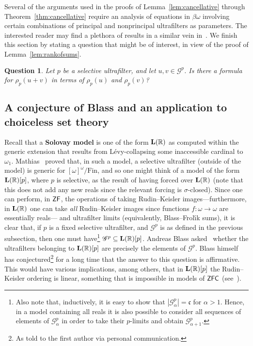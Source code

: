 \documentclass[10pt]{amsart}
\newcommand{\lr}{\mathnormal{\mathbf{L}(\mathbb R)}}
\newcommand{\zf}{\mathnormal{\mathsf{ZF}}}
\newcommand{\zfc}{\mathnormal{\mathsf{ZFC}}}
\newtheorem{question}[theorem]{Question}
\theoremstyle{definition}
\theoremstyle{remark}
\begin{document}
Several of the arguments used in the proofs of Lemma~\ref{lem:cancellative} through Theorem~\ref{thm:cancellative} require an analysis of equations in $\beta\omega$ involving certain combinations of principal and nonprincipal ultrafilters as parameters. The interested reader may find a plethora of results in a similar vein in~\cite{maleki}. We finish this section by stating a question that might be of interest, in view of the proof of Lemma~\ref{lem:rankofsums}.

\begin{question}
Let $p$ be a selective ultrafilter, and let $u,v\in\mathscr G^p$. Is there a formula for $\rho_p(u+v)$ in terms of $\rho_p(u)$ and $\rho_p(v)$?
\end{question}


\subsection{A conjecture of Blass and an application to choiceless set theory}

Recall that a {\bf Solovay model} is one of the form $\lr$ as computed within the generic extension that results from L\'evy-collapsing some inaccessible cardinal to $\omega_1$. Mathias~\cite{mathias-happy} proved that, in such a model, a selective ultrafilter (outside of the model) is generic for $[\omega]^{\omega}/\mathrm{Fin}$, and so one might think of a model of the form $\lr[p]$, where $p$ is selective, as the result of having forced over $\lr$ (note that this does not add any new reals since the relevant forcing is $\sigma$-closed). Since one can perform, in $\zf$, the operations of taking Rudin--Keisler images---furthermore, in $\lr$ one can take {\it all} Rudin--Keisler images since functions $f:\omega\longrightarrow\omega$ are essentially reals--- and ultrafilter limits (equivalently, Blass--Frol\'{\i}k sums), it is clear that, if $p$ is a fixed selective ultrafilter, and $\mathscr G^p$ is as defined in the previous subsection, then one must have\footnote{Also note that, inductively, it is easy to show that $|\mathscr G_\alpha^p|=\mathfrak c$ for $\alpha>1$. Hence, in a model containing all reals it is also possible to consider all sequences of elements of $\mathscr G_\alpha^p$ in order to take their $p$-limits and obtain $\mathscr G_{\alpha+1}^p$.} $\mathscr G^p\subseteq\lr[p]$. Andreas Blass asked~\cite[Question, p. 251]{blass-selective} whether the ultrafilters belonging to $\lr[p]$ are precisely the elements of $\mathscr G^p$. Blass himself has conjectured\footnote{As told to the first author via personal communication.} for a long time that the answer to this question is affirmative. This would have various implications, among others, that in $\lr[p]$ the Rudin--Keisler ordering is linear, something that is impossible in models of $\zfc$ (see~\cite[Question, p. 251]{blass-selective}).
\end{document}
